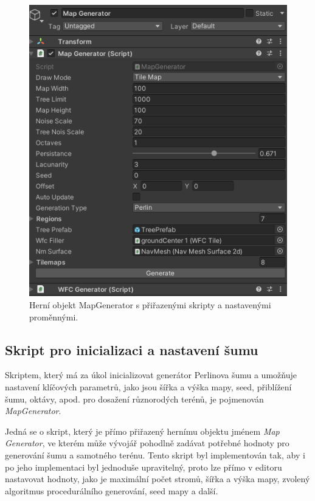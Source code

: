\begin{figure}[H]
	\centering
	\includegraphics[scale=1]{obrazky-figures/MapGeneratorVariables.png}
	\caption{Herní objekt MapGenerator s přiřazenými skripty a nastavenými proměnnými.}
	\label{fig:MapGeneratorVariables}
\end{figure}

\subsection{Skript pro inicializaci a nastavení šumu}
Skriptem, který má za úkol inicializovat generátor Perlinova šumu a umožňuje nastavení klíčových parametrů, jako jsou šířka a výška mapy, seed, přiblížení šumu, oktávy, apod. pro dosažení různorodých terénů, je pojmenován \textit{MapGenerator}. 

Jedná se o skript, který je přímo přiřazený hernímu objektu jménem \textit{Map Generator}, ve kterém může vývojář pohodlně zadávat potřebné hodnoty pro generování šumu a samotného terénu. Tento skript byl implementován tak, aby i po jeho implementaci byl jednoduše upravitelný, proto lze přímo v editoru nastavovat hodnoty, jako je maximální počet stromů, šířka a výška mapy, zvolený algoritmus procedurálního generování, seed mapy a další.

